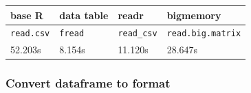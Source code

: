 \documentclass[]{article}
\begin{document}
\begin{longtable}[c]{@{}llll@{}}
\toprule
\begin{minipage}[b]{0.05\columnwidth}\raggedright\strut
\textbf{base R}
\strut\end{minipage} &
\begin{minipage}[b]{0.05\columnwidth}\raggedright\strut
\textbf{data table}
\strut\end{minipage} &
\begin{minipage}[b]{0.05\columnwidth}\raggedright\strut
\textbf{readr}
\strut\end{minipage} &
\begin{minipage}[b]{0.05\columnwidth}\raggedright\strut
\textbf{bigmemory}
\strut\end{minipage}\tabularnewline
\midrule
\endhead
\begin{minipage}[t]{0.05\columnwidth}\raggedright\strut
\texttt{read.csv}
\strut\end{minipage} &
\begin{minipage}[t]{0.05\columnwidth}\raggedright\strut
\texttt{fread}
\strut\end{minipage} &
\begin{minipage}[t]{0.05\columnwidth}\raggedright\strut
\texttt{read\_csv}
\strut\end{minipage} &
\begin{minipage}[t]{0.05\columnwidth}\raggedright\strut
\texttt{read.big.matrix}
\strut\end{minipage}\tabularnewline
\begin{minipage}[t]{0.05\columnwidth}\raggedright\strut
52.203s
\strut\end{minipage} &
\begin{minipage}[t]{0.05\columnwidth}\raggedright\strut
8.154s
\strut\end{minipage} &
\begin{minipage}[t]{0.05\columnwidth}\raggedright\strut
11.120s
\strut\end{minipage} &
\begin{minipage}[t]{0.05\columnwidth}\raggedright\strut
28.647s
\strut\end{minipage}\tabularnewline
\bottomrule
\end{longtable}

\subsubsection{Convert dataframe to
format}\label{convert-dataframe-to-format}
\end{document}
